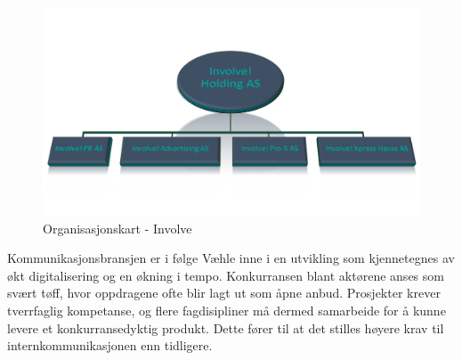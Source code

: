 \begin{figure}[H]
\centering
\includegraphics [scale=0.45]{bilder/org.png}
\caption{Organisasjonskart - Involve}
\label{fig:org}
\end{figure}

\indent \newline
Kommunikasjonsbransjen er i følge Væhle inne i en utvikling som kjennetegnes av økt digitalisering og en økning i tempo. Konkurransen blant aktørene anses som svært tøff, hvor oppdragene ofte blir lagt ut som åpne anbud. Prosjekter krever tverrfaglig kompetanse, og flere fagdisipliner må dermed samarbeide for å kunne levere et konkurransedyktig produkt. Dette fører til at det stilles høyere krav til internkommunikasjonen enn tidligere. 
